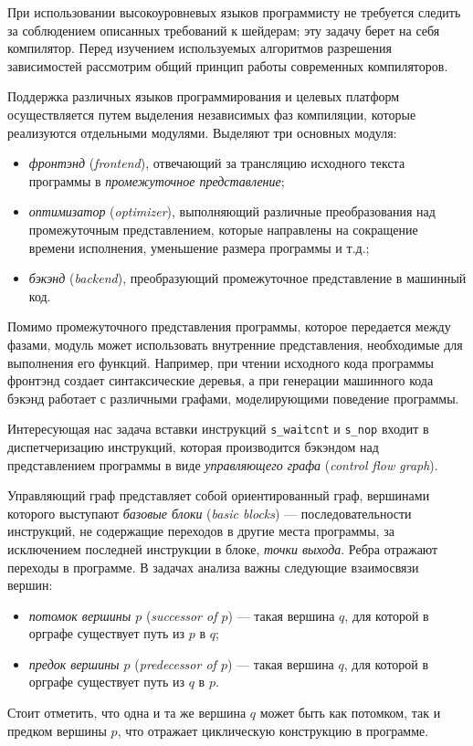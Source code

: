 \documentclass[a4paper,14pt]{extarticle}
\newenvironment{ul}{\begin{itemize}[noitemsep,topsep=0em]}{\end{itemize}\vspace{4mm}}
\newenvironment{inlineul}{\begin{itemize}[noitemsep,topsep=0em]}{\end{itemize}}
\begin{document}
При использовании высокоуровневых языков программисту не требуется следить за соблюдением
описанных требований к шейдерам; эту задачу берет на себя компилятор.
Перед изучением используемых алгоритмов разрешения зависимостей рассмотрим общий
принцип работы современных компиляторов.

Поддержка различных языков программирования и целевых платформ осуществляется
путем выделения независимых фаз компиляции, которые реализуются отдельными модулями.
Выделяют три основных модуля\cite[Глава~1]{compilers}:

\begin{ul}
\item \textit{фронтэнд} (\textit{frontend}), отвечающий за трансляцию исходного текста программы в
  \textit{промежуточное представление};
\item \textit{оптимизатор} (\textit{optimizer}), выполняющий различные преобразования над промежуточным
  представлением, которые направлены на сокращение времени исполнения,
  уменьшение размера программы и т.д.;
\item \textit{бэкэнд} (\textit{backend}), преобразующий промежуточное представление в машинный код.
\end{ul}

Помимо промежуточного представления программы, которое передается между фазами,
модуль может использовать внутренние представления, необходимые для выполнения его функций.
Например, при чтении исходного кода программы фронтэнд создает синтаксические деревья,
а при генерации машинного кода бэкэнд работает с различными графами, моделирующими поведение
программы.

Интересующая нас задача вставки инструкций \texttt{s\_waitcnt} и \texttt{s\_nop} входит
в диспетчеризацию инструкций, которая производится бэкэндом над представлением программы
в виде \textit{управляющего графа} (\textit{control flow graph}).

Управляющий граф\cite{cfg-allen}\cite{cfg-ru} представляет собой ориентированный граф, вершинами которого
выступают \textit{базовые блоки} (\textit{basic blocks}) — последовательности инструкций,
не содержащие переходов в другие места программы, за исключением последней
инструкции в блоке, \textit{точки выхода}. Ребра отражают переходы в программе.
В задачах анализа важны следующие взаимосвязи вершин:
\begin{inlineul}
\item \textit{потомок вершины $p$} (\textit{successor of $p$}) — такая вершина $q$,
  для которой в орграфе существует путь из $p$ в $q$;
\item \textit{предок вершины $p$} (\textit{predecessor of $p$}) — такая вершина $q$,
  для которой в орграфе существует путь из $q$ в $p$.
\end{inlineul}
Стоит отметить, что одна и та же вершина $q$ может быть как потомком, так и предком вершины $p$,
что отражает циклическую конструкцию в программе.
\end{document}
